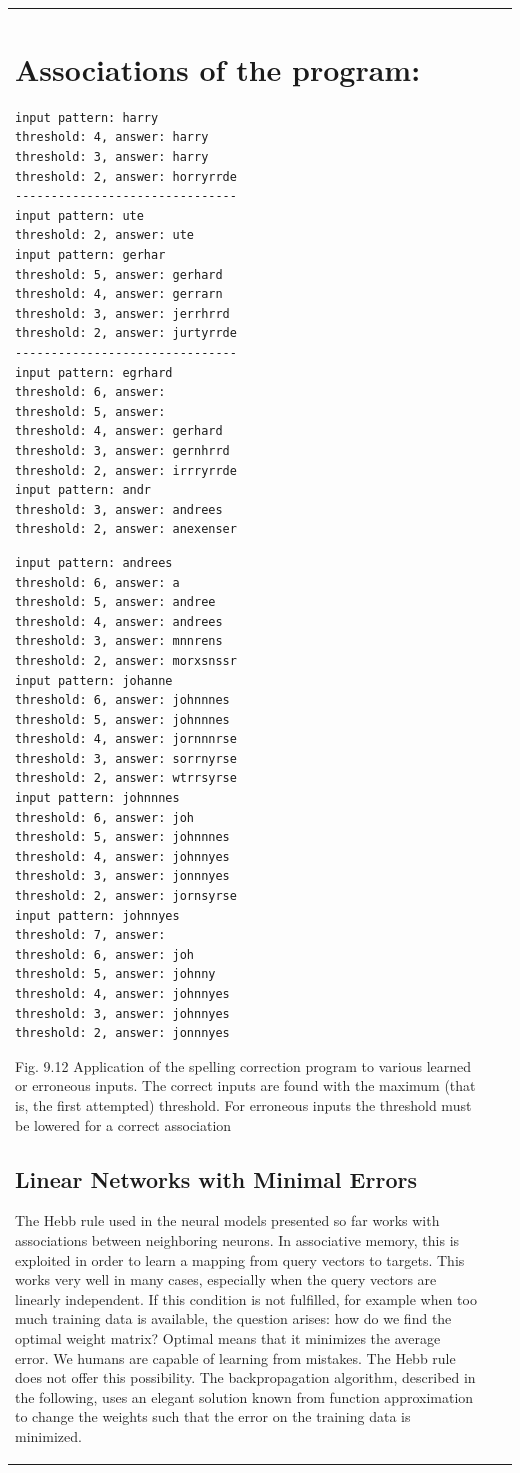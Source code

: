 \documentclass[10pt]{book}
\begin{document}
\begin{center}
\begin{tabular}{|l|l|l|}
\section{Associations of the program:}
\begin{verbatim}
input pattern: harry
threshold: 4, answer: harry
threshold: 3, answer: harry
threshold: 2, answer: horryrrde
-------------------------------
input pattern: ute
threshold: 2, answer: ute
input pattern: gerhar
threshold: 5, answer: gerhard
threshold: 4, answer: gerrarn
threshold: 3, answer: jerrhrrd
threshold: 2, answer: jurtyrrde
-------------------------------
input pattern: egrhard
threshold: 6, answer:
threshold: 5, answer:
threshold: 4, answer: gerhard
threshold: 3, answer: gernhrrd
threshold: 2, answer: irrryrrde
input pattern: andr
threshold: 3, answer: andrees
threshold: 2, answer: anexenser
\end{verbatim}

\begin{verbatim}
input pattern: andrees
threshold: 6, answer: a
threshold: 5, answer: andree
threshold: 4, answer: andrees
threshold: 3, answer: mnnrens
threshold: 2, answer: morxsnssr
input pattern: johanne
threshold: 6, answer: johnnnes
threshold: 5, answer: johnnnes
threshold: 4, answer: jornnnrse
threshold: 3, answer: sorrnyrse
threshold: 2, answer: wtrrsyrse
input pattern: johnnnes
threshold: 6, answer: joh
threshold: 5, answer: johnnnes
threshold: 4, answer: johnnyes
threshold: 3, answer: jonnnyes
threshold: 2, answer: jornsyrse
input pattern: johnnyes
threshold: 7, answer:
threshold: 6, answer: joh
threshold: 5, answer: johnny
threshold: 4, answer: johnnyes
threshold: 3, answer: johnnyes
threshold: 2, answer: jonnnyes
\end{verbatim}

Fig. 9.12 Application of the spelling correction program to various learned or erroneous inputs. The correct inputs are found with the maximum (that is, the first attempted) threshold. For erroneous inputs the threshold must be lowered for a correct association

\subsection{Linear Networks with Minimal Errors}
The Hebb rule used in the neural models presented so far works with associations between neighboring neurons. In associative memory, this is exploited in order to learn a mapping from query vectors to targets. This works very well in many cases, especially when the query vectors are linearly independent. If this condition is not fulfilled, for example when too much training data is available, the question arises: how do we find the optimal weight matrix? Optimal means that it minimizes the average error.
We humans are capable of learning from mistakes. The Hebb rule does not offer this possibility. The backpropagation algorithm, described in the following, uses an elegant solution known from function approximation to change the weights such that the error on the training data is minimized.


\end{tabular}
\end{center}
\end{document}
